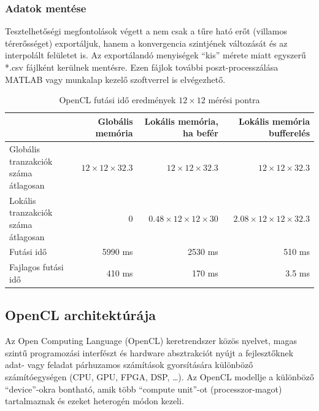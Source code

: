 	\subsubsection{Adatok mentése}
	Tesztelhetőségi megfontolások végett a nem csak a tűre ható erőt (villamos
	térerősséget) exportáljuk, hanem a konvergencia szintjének változását és az
	interpolált felületet is. Az exportálandó menyiségek ``kis''
	mérete miatt egyszerű *.csv fájlként kerülnek mentésre. Ezen fájlok további
	poszt-processzálása MATLAB vagy munkalap kezelő szoftverrel is elvégezhető.
	
	\begin{table}[!Ht]
		\caption{\scriptsize OpenCL futási idő eredmények $12\times12$ mérési pontra}
		\label{table:openresult}
		\centering
		\begin{tabular}{l|r|r|r}
		 & Globális memória & Lokális memória, ha befér & Lokális memória bufferelés\\ \hline
		\parbox{2.5cm}{Globális tranzakciók száma átlagosan} & $12 \times 12\times 32.3$
		& $12 \times 12 \times 32.3$ & $12 \times 12 \times 32.3$\\
		\parbox{2.5cm}{Lokális tranzakciók száma átlagosan} & 0 &
		$0.48 \times 12 \times 12 \times 30$ & $2.08 \times 12 \times12 \times 32.3$\\
		Futási idő & 5990 ms & 2530 ms & 510 ms\\
		Fajlagos futási idő & 410 ms & 170 ms & 3.5 ms 
		\end{tabular}
	\end{table}

\subsection{OpenCL architektúrája}
	Az Open Computing Language (OpenCL) keretrendszer \cite{opencl} közös
	nyelvet, magas szintű programozási interfészt és hardware absztrakciót nyújt a fejlesztőknek
	adat- vagy feladat párhuzamos számítások gyorsítására különböző
	számítóegységen (CPU, GPU, FPGA, DSP, \ldots).
	Az OpenCL modellje a különböző ``device''-okra bontható, amik több ``compute unit''-ot
	(processzor-magot) tartalmaznak és ezeket heterogén módon kezeli. 
	
